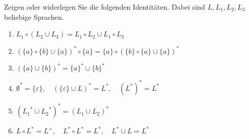 
\begin{exercise}
Zeigen oder widerlegen Sie die folgenden Identitäten. Dabei sind $L,L_1,L_2,L_3$ beliebige Sprachen.
\begin{enumerate}
  \item $L_1\circ(L_2\cup L_3)=L_1\circ L_2\cup L_1\circ L_3$%
  \item $(\{a\}\circ\{b\}\cup\{a\})^{*}\circ\{a\}=\{a\}\circ(\{b\}\circ\{a\}\cup\{a\})^{*}$
  \item $(\{a\}\cup\{b\})^{*}=\{a\}^{*}\cup\{b\}^{*}$
  \item $\emptyset^{*}=\{\varepsilon\},\quad (\{\varepsilon\}\cup L)^{*}=L^{*},\quad (L^{*})^{*}=L^{*}$
  \item $({L_1}^{*}\cup {L_2}^{*})^{*}=(L_1\cup L_2)^{*}$
  \item $L\circ L^{*}=L^{+},\quad L^{*}\circ L^{*}=L^{*},\quad L^* \cup L=L^{*}$
\end{enumerate}
\end{exercise}
